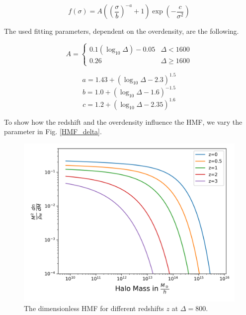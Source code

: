 \begin{equation}
    f(\sigma)=A \left( \left(\frac{\sigma}{b}\right)^{-a}+1\right)\exp(-\frac{c}{\sigma^2})
\end{equation}

The used fitting parameters, dependent on the overdensity, are the following.

\[ A = \begin{cases}
    0.1(\log_{10}\Delta)-0.05 & \Delta<1600 \\
    0.26 & \Delta \geq 1600
\end{cases}
\]

\begin{equation}
    a=1.43+(\log_{10}\Delta -2.3)^{1.5}
\end{equation}
\begin{equation}
    b=1.0+(\log_{10}\Delta -1.6)^{-1.5}
\end{equation}
\begin{equation}
    c=1.2+(\log_{10}\Delta -2.35)^{1.6}
\end{equation}

To show how the redshift and the overdensity influence the HMF, we vary the parameter in Fig. \ref{HMF_delta}.

\begin{figure}
    \centering
    \includegraphics[width=0.9\linewidth, clip]{Images/HMF_diff_z.png}
    \caption{The dimensionless HMF for different redshifts $z$ at $\Delta=800$.}
    \label{HMF_z}
\end{figure} 

